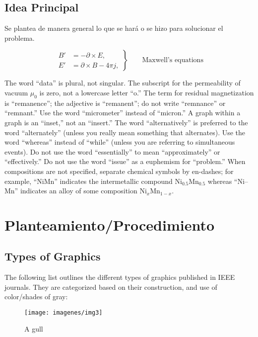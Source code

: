 \documentclass[a4paper]{IEEEtran} %
\begin{document}
\subsection{Idea Principal}

Se plantea de manera general lo que se hará o se hizo para solucionar el problema.

\begin{equation}
 \left.\begin{aligned}
        B'&=-\partial \times E,\\
        E'&=\partial \times B - 4\pi j,
       \end{aligned}
 \right\}
 \qquad \text{Maxwell's equations}
\end{equation}

The word ``data'' is plural, not singular. The subscript for the 
permeability of vacuum $\mu _{0}$ is zero, not a lowercase letter 
``o.'' The term for residual magnetization is ``remanence''; the adjective 
is ``remanent''; do not write ``remnance'' or ``remnant.'' Use the word 
``micrometer'' instead of ``micron.'' A graph within a graph is an 
``inset,'' not an ``insert.'' The word ``alternatively'' is preferred to the 
word ``alternately'' (unless you really mean something that alternates). Use 
the word ``whereas'' instead of ``while'' (unless you are referring to 
simultaneous events). Do not use the word ``essentially'' to mean 
``approximately'' or ``effectively.'' Do not use the word ``issue'' as a 
euphemism for ``problem.'' When compositions are not specified, separate 
chemical symbols by en-dashes; for example, ``NiMn'' indicates the 
intermetallic compound Ni$_{0.5}$Mn$_{0.5}$ whereas 
``Ni--Mn'' indicates an alloy of some composition 
Ni$_{x}$Mn$_{1-x}$.

\section{Planteamiento/Procedimiento}
\label{sec:guidelines}

\subsection{Types of Graphics}
The following list outlines the different types of graphics published in 
IEEE journals. They are categorized based on their construction, and use of 
color/shades of gray:

\begin{figure}
    \centering
        \texttt{[image: imagenes/img3]}
        \caption{A gull}
        \label{fig:gull}
\end{figure}
\end{document}
